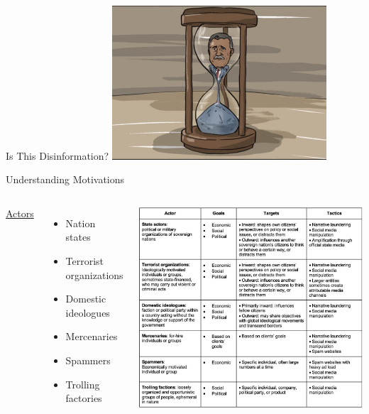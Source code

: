 \documentclass[nobackground,dvipsnames,table,aspectratio=169]{beamer}
\begin{document}
\begin{frame}{Is This Disinformation?}
    \centering
    \includegraphics[width=0.6\textwidth]{is-this-disinfo}
\end{frame}

\begin{frame}{Understanding Motivations}
    \begin{columns}
            \underline{Actors}
            \begin{itemize}
                \item Nation states
                \item Terrorist organizations
                \item Domestic ideologues
                \item Mercenaries
                \item Spammers
                \item Trolling factories
            \end{itemize}
            \centering
            \includegraphics[height=0.856\textheight]{actor-table}
    \end{columns}
\end{frame}
\end{document}
